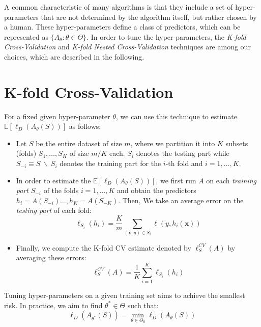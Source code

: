 
A common characteristic of many algorithms is that they include a set of hyper-parameters that are not determined by the algorithm itself, but rather chosen by a human. These hyper-parameters define a class of predictors, which can be represented as $\{A_\theta: \theta \in \Theta\}$. In order to tune the hyper-parameters, the \textit{K-fold Cross-Validation} and \textit{K-fold Nested Cross-Validation} techniques are among our choices, which are described in the following.

\section{K-fold Cross-Validation}

For a fixed given hyper-parameter $\theta$, we can use this technique to estimate $\mathbb{E}[\ell_{D}(A_\theta(S))]$ as follows:
\begin{itemize}
    \item Let $S$ be the entire dataset of size $m$, where we partition it into $K$ subsets (folds) $S_1, \dots, S_K$ of size $m/K$ each. $S_i$ denotes the testing part while $S_{-i} \equiv S\ \backslash\  S_i$ denotes the training part for the $i$-th fold and $i = 1, \dots, K$.
    \item In order to estimate the $\mathbb{E}[\ell_{D}(A_\theta(S))]$, we first run $A$ on each \textit{training part} $S_{-i}$ of the folds $i = 1, \dots, K$ and obtain the predictors $h_i = A(S_{-i}) \dots, h_K = A(S_{-K})$. Then, We take an average error on the \textit{testing part} of each fold:
    \begin{equation}
        \ell_{S_{i}}(h_i) = \frac{K}{m} \sum_{(\boldsymbol{x},y) \in S_{i}} \ell(y, h_i(\boldsymbol{x}))    
    \end{equation}
    \item Finally, we compute the K-fold CV estimate denoted by $\ell_{S}^{CV}(A)$ by averaging these errors:
    \begin{equation}
        \ell_{S}^{CV}(A) = \frac{1}{K} \sum\limits_{i=1}^{K} \ell_{S_{i}}(h_i)
    \end{equation}
\end{itemize}

Tuning hyper-parameters on a given training set aims to achieve the smallest risk. In practice, we aim to find $\theta^* \in \Theta$ such that:
\begin{equation}
    \ell_{D}(A_{\theta^*}(S)) = \min_{\theta \in \Theta_0} \ell_{D}(A_\theta(S))
\end{equation}

